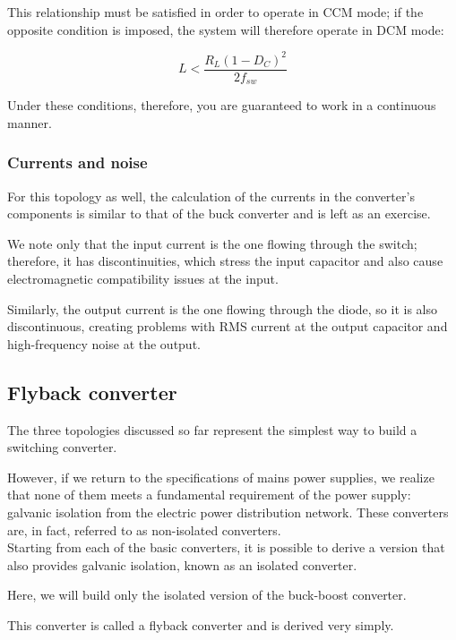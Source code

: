 \documentclass[../main.tex]{subfiles}
\begin{document}
This relationship must be satisfied in order to operate in CCM mode; if the opposite condition is imposed, the system will therefore operate in DCM mode:

\begin{equation}
	L < \frac{R_L(1-D_C)^2}{2f_{sw}}
\end{equation}


Under these conditions, therefore, you are guaranteed to work in a continuous manner.

\subsubsection{Currents and noise}

For this topology as well, the calculation of the currents in the converter’s components is similar to that of the buck converter and is left as an exercise. 

We note only that the input current is the one flowing through the switch; therefore, it has discontinuities, which stress the input capacitor and also cause electromagnetic compatibility issues at the input. 

Similarly, the output current is the one flowing through the diode, so it is also discontinuous, creating problems with RMS current at the output capacitor and high-frequency noise at the output.


\subsection{Flyback converter}



The three topologies discussed so far represent the simplest way to build a switching converter. 

However, if we return to the specifications of mains power supplies, we realize that none of them meets a fundamental requirement of the power supply: galvanic isolation from the electric power distribution network. These converters are, in fact, referred to as non-isolated converters.\\


Starting from each of the basic converters, it is possible to derive a version that also provides galvanic isolation, known as an isolated converter. 

Here, we will build only the isolated version of the buck-boost converter. 

This converter is called a flyback converter and is derived very simply.\\
\end{document}
